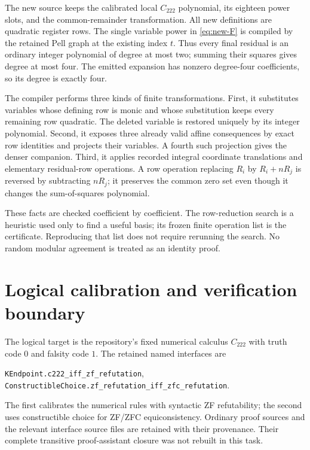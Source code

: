 \documentclass[11pt]{article}
\theoremstyle{definition}
\begin{document}
The new source keeps the calibrated local $C_{222}$ polynomial, its
eighteen power slots, and the common-remainder transformation. All new
definitions are quadratic register rows. The single variable power in
\eqref{eq:new-F} is compiled by the retained Pell graph at the existing
index $t$. Thus every final residual is an ordinary integer polynomial
of degree at most two; summing their squares gives degree at most four.
The emitted expansion has nonzero degree-four coefficients, so its
degree is exactly four.

The compiler performs three kinds of finite transformations. First, it
substitutes variables whose defining row is monic and whose substitution
keeps every remaining row quadratic. The deleted variable is restored
uniquely by its integer polynomial. Second, it exposes three already
valid affine consequences by exact row identities and projects their
variables. A fourth such projection gives the denser companion. Third,
it applies recorded integral coordinate translations and elementary
residual-row operations. A row operation replacing $R_i$ by
$R_i+nR_j$ is reversed by subtracting $nR_j$; it preserves the common
zero set even though it changes the sum-of-squares polynomial.

These facts are checked coefficient by coefficient. The row-reduction
search is a heuristic used only to find a useful basis; its frozen finite
operation list is the certificate. Reproducing that list does not require
rerunning the search. No random modular agreement is treated as an
identity proof.

\section{Logical calibration and verification boundary}

The logical target is the repository's fixed numerical calculus
$C_{222}$ with truth code $0$ and falsity code $1$. The retained named
interfaces are
\begin{center}\small
\nolinkurl{KEndpoint.c222_iff_zf_refutation},\\
\nolinkurl{ConstructibleChoice.zf_refutation_iff_zfc_refutation}.
\end{center}
The first calibrates the numerical rules with syntactic ZF refutability;
the second uses constructible choice for ZF/ZFC equiconsistency. Ordinary
proof sources and the relevant interface source files are retained with
their provenance. Their complete transitive proof-assistant closure was
not rebuilt in this task.
\end{document}
